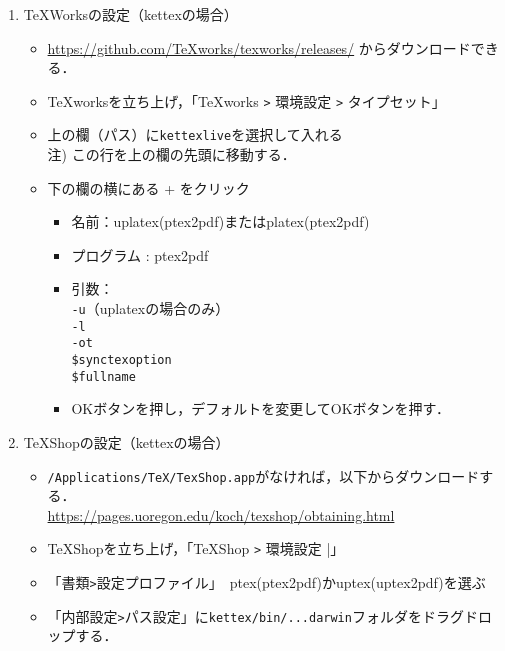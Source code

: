 \documentclass{ujarticle}
\begin{document}
\begin{enumerate}[\bf\large 1.]
\item TeXWorksの設定（kettexの場合）
  \begin{itemize}
  \item \url{https://github.com/TeXworks/texworks/releases/} からダウンロードできる．
  \item TeXworksを立ち上げ，「TeXworks \verb|>| 環境設定 \verb|>| タイプセット」
  \item 上の欄（パス）に\verb|kettexlive|を選択して入れる\\
  \hspace*{10mm}注) この行を上の欄の先頭に移動する．
  \item 下の欄の横にある + をクリック
    \begin{itemize}
    \item 名前：uplatex(ptex2pdf)またはplatex(ptex2pdf)
    \item プログラム : ptex2pdf
    \item 引数：\\
    \hspace*{10mm} \verb|-u|（uplatexの場合のみ）\\
    \hspace*{10mm} \verb|-l|\\
    \hspace*{10mm} \verb|-ot|\\
    \hspace*{10mm}  \verb|$synctexoption|\\
    \hspace*{10mm}  \verb|$fullname|
    \item[]OKボタンを押し，デフォルトを変更してOKボタンを押す．
    \end{itemize}
  \end{itemize}

\item TeXShopの設定（kettexの場合）
  \begin{itemize}
  \item \verb|/Applications/TeX/TexShop.app|がなければ，以下からダウンロードする．\\
  \hspace*{5mm}\url{https://pages.uoregon.edu/koch/texshop/obtaining.html}
  \item TeXShopを立ち上げ，「TeXShop \verb|>| 環境設定 |」
  \item 「書類\verb|>|設定プロファイル」　ptex(ptex2pdf)かuptex(uptex2pdf)を選ぶ
  \item 「内部設定\verb|>|パス設定」に\verb|kettex/bin/...darwin|フォルダをドラグドロップする．
  \end{itemize}


\end{enumerate}
\end{document}

